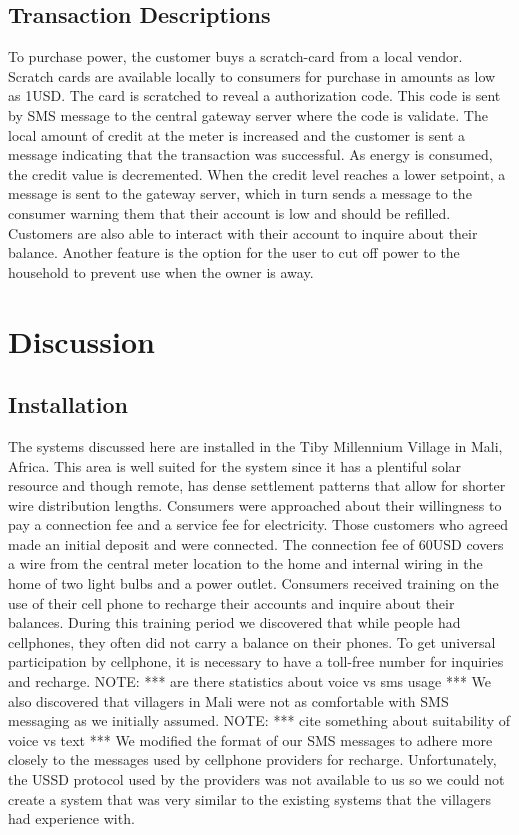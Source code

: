 \documentclass[conference]{IEEEtran}
\newcommand{\note}[1]{{\color{red} NOTE: *** #1 ***}}
\begin{document}
\subsection{Transaction Descriptions}
To purchase power, the customer buys a scratch-card from a local vendor.
Scratch cards are available locally
to consumers for purchase in amounts as low as 1USD.  
The card is scratched to reveal a authorization code.  This code is sent by
SMS message to the central gateway server where the code is validate.  
The local amount of credit at
the meter is increased and the customer is sent a message indicating that 
the transaction was successful.  
As energy is consumed, the credit value is 
decremented.  When the credit level reaches a lower setpoint, a message is sent
to the gateway server, which in turn sends a message to the consumer warning them
that their account is low and should be refilled.  
Customers are also able to interact with their account to inquire about their 
balance.  Another feature is the option for the user to cut off power to the
household to prevent use when the owner is away.

\section{Discussion}

\subsection{Installation}
The systems discussed here are installed in the Tiby Millennium Village
in Mali, Africa.  This area is well suited for the system since it has
a plentiful solar resource and though remote, has dense settlement 
patterns that allow for shorter wire distribution lengths.  Consumers were 
approached about their willingness to pay a connection fee and a service
fee for electricity.  Those customers who agreed made an initial deposit 
and were connected.  
The connection fee of 60USD covers a wire from the central meter location
to the home and internal wiring in the home of two light bulbs and a 
power outlet.  Consumers received training on the use of their cell phone
to recharge their accounts and inquire about their balances.  
During this 
training period we discovered that while people had cellphones, they often
did not carry a balance on their phones.  To get universal participation
by cellphone, it is necessary to have a toll-free number for inquiries
and recharge.  
\note{are there statistics about voice vs sms usage}
We also discovered that villagers in Mali were not as comfortable 
with SMS messaging as we initially assumed.  \note{cite something about
suitability of voice vs text}  We modified the format of our
SMS messages to adhere more closely to the messages used by cellphone 
providers for recharge.  Unfortunately, the USSD protocol used by the
providers was not available to us so we could not create a system that was
very similar to the existing systems that the villagers had experience with.
\end{document}
